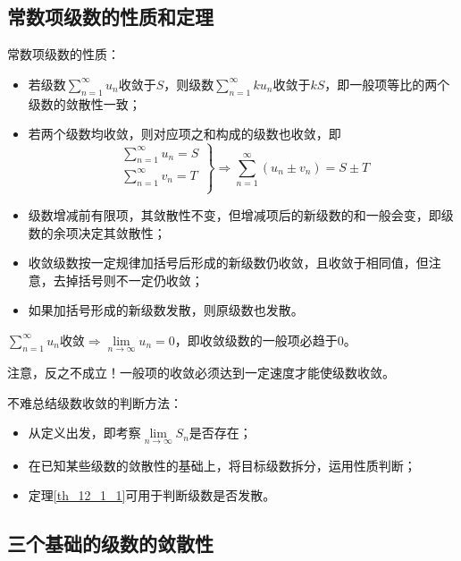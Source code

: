 \subsection{常数项级数的性质和定理}

常数项级数的性质：
\begin{itemize}
    \item 若级数$\sum_{n=1}^{\infty}{u_n}$收敛于$S$，则级数$\sum_{n=1}^{\infty}{ku_n}$收敛于$kS$，即一般项等比的两个级数的敛散性一致；
    \item 若两个级数均收敛，则对应项之和构成的级数也收敛，即
    \[
    \left. \begin{array}{r}
        \sum_{n=1}^{\infty}{u_n}=S\\
        \sum_{n=1}^{\infty}{v_n}=T\\
    \end{array} \right\} \Rightarrow \sum_{n=1}^{\infty}{\left( u_n\pm v_n \right)}=S\pm T
    \]
    \item 级数增减前有限项，其敛散性不变，但增减项后的新级数的和一般会变，即级数的余项决定其敛散性；
    \item 收敛级数按一定规律加括号后形成的新级数仍收敛，且收敛于相同值，但注意，去掉括号则不一定仍收敛；
    \item 如果加括号形成的新级数发散，则原级数也发散。
\end{itemize}

\begin{theorem} \label{th_12_1_1}
$\sum_{n=1}^{\infty}{u_n} \text{收敛} \Rightarrow \underset{n\rightarrow \infty}{\lim}u_n=0$，即收敛级数的一般项必趋于0。
\end{theorem}

注意，反之不成立！一般项的收敛必须达到一定速度才能使级数收敛。

不难总结级数收敛的判断方法：
\begin{itemize}
    \item 从定义出发，即考察$\underset{n\rightarrow \infty}{\lim}S_n$是否存在；
    \item 在已知某些级数的敛散性的基础上，将目标级数拆分，运用性质判断；
    \item 定理\ref{th_12_1_1}可用于判断级数是否发散。
\end{itemize}

\subsection{三个基础的级数的敛散性}

